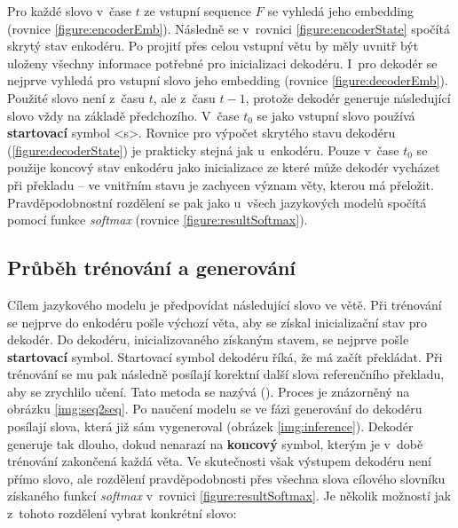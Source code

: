 Pro každé slovo v~čase $t$ ze vstupní sequence $F$ se vyhledá jeho embedding (rovnice \ref{figure:encoderEmb}). Následně se v~rovnici \ref{figure:encoderState} spočítá skrytý stav enkodéru. Po projití přes celou vstupní větu by měly uvnitř být uloženy všechny informace potřebné pro inicializaci dekodéru. I~pro dekodér se nejprve vyhledá pro vstupní slovo jeho embedding (rovnice \ref{figure:decoderEmb}). Použité slovo není z~času $t$, ale z~času $t-1$, protože dekodér generuje následující slovo vždy na základě předchozího. V~čase $t_0$ se jako vstupní slovo používá \textbf{startovací} symbol <s>. Rovnice pro výpočet skrytého stavu dekodéru (\ref{figure:decoderState}) je prakticky stejná jak u~enkodéru. Pouze v~čase $t_0$ se použije koncový stav enkodéru jako inicializace ze které může dekodér vycházet při překladu -- ve vnitřním stavu je zachycen význam věty, kterou má přeložit. Pravděpodobnostní rozdělení se pak jako u~všech jazykových modelů spočítá pomocí funkce \emph{softmax} (rovnice \ref{figure:resultSoftmax}).


\subsection{Průběh trénování a generování}

Cílem jazykového modelu je předpovídat následující slovo ve větě. Při trénování se nejprve do enkodéru pošle výchozí věta, aby se získal inicializační stav pro dekodér. Do dekodéru, inicializovaného získaným stavem, se nejprve pošle \textbf{startovací} symbol. Startovací symbol dekodéru říká, že má začít překládat. Při trénování se mu pak následně posílají korektní další slova referenčního překladu, aby se zrychlilo učení. Tato metoda se nazývá \label{teacherForcing} (\cite{teacherForcing}). Proces je znázorněný na obrázku \ref{img:seq2seq}. Po naučení modelu se ve fázi generování do dekodéru posílají slova, která již sám vygeneroval (obrázek \ref{img:inference}). Dekodér generuje tak dlouho, dokud nenarazí na \textbf{koncový} symbol, kterým je v~době trénování zakončená každá věta. Ve skutečnosti však výstupem dekodéru není přímo slovo, ale rozdělení pravděpodobnosti přes všechna slova cílového slovníku získaného funkcí \emph{softmax} v~rovnici \ref{figure:resultSoftmax}. Je několik možností jak z~tohoto rozdělení vybrat konkrétní slovo:

